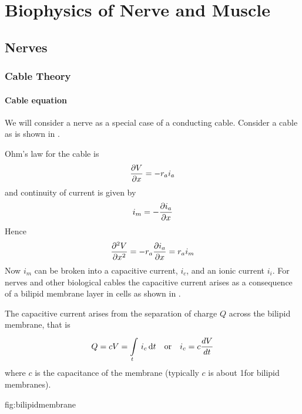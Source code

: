 \chapter{Biophysics of Nerve and Muscle}

\section{Nerves}

\subsection{Cable Theory}

\subsubsection{Cable equation}
We will consider a nerve as a special case of a conducting cable.
Consider a cable as is shown in .

Ohm's law for the cable is
\begin{equation*}
   \dfrac{\partial V}{\partial x} =-r_{a}i_{a}
\end{equation*}
and continuity of current is given by
\begin{equation*}
  i_{m}=- \dfrac{\partial i_{a}}{\partial x} 
\end{equation*}
Hence
\begin{equation*}
   \dfrac{\partial^{2} V}{\partial {x}^{2}} =-r_{a} \dfrac{\partial i_{a}}{\partial x} =r_{a}i_{m}
\end{equation*}
Now $i_{m}$ can be broken into a capacitive current, $i_{c}$, and an ionic
current $i_{i}$. For nerves and other biological cables the capacitive current
arises as a consequence of a bilipid membrane layer in cells as shown in
\nocite{zzz-berne:1988}.

The capacitive current arises from the separation of charge $Q$ across the
bilipid membrane, that is
\begin{equation*}
  Q=cV=\goneint{i_{c}}{t} \quad \text{or} \quad i_{c} = c\dby{V}{t}
\end{equation*}
where $c$ is the capacitance of the membrane (typically $c$ is about
1\uFpcmpcm for bilipid membranes).

{fig:bilipidmembrane}

